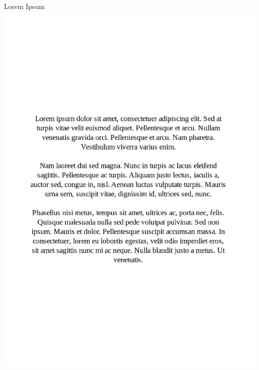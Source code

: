 
\begin{Mfigure}{Lorem Ipsum}
 \centering
 \includegraphics[width=\linewidth]{Figure-C1.pdf}
 \caption[\figuretitle]
{\textbf{(A) Lorem Ipsum.} Add as much text here as you want.}
\label{fig:c1}
\end{Mfigure}



